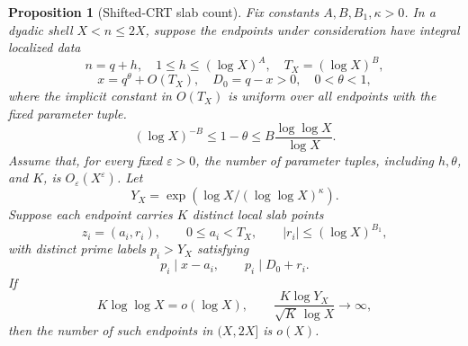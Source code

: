 \documentclass[11pt]{article}
\newtheorem{proposition}[theorem]{Proposition}
\theoremstyle{definition}
\newcommand{\eps}{\varepsilon}
\newcommand{\1}{\mathbf 1}
\begin{document}
\begin{proposition}[Shifted-CRT slab count]\label{prop:slab}
Fix constants \(A,B,B_1,\kappa>0\).  In a dyadic shell \(X<n\le2X\), suppose the
endpoints under consideration have integral localized data
\[
  n=q+h,\quad 1\le h\le(\log X)^A,\quad T_X=(\log X)^B,
\]
\[
  x=q^\theta+O(T_X),\quad D_0=q-x>0,\quad 0<\theta<1,
\]
where the implicit constant in \(O(T_X)\) is uniform over all endpoints with
the fixed parameter tuple.
\[
  (\log X)^{-B}\le 1-\theta\le B\frac{\log\log X}{\log X}.
\]
Assume that, for every fixed \(\eps>0\), the number of parameter tuples,
including \(h,\theta\), and \(K\), is \(O_\eps(X^\eps)\).  Let
\[
  Y_X=\exp(\log X/(\log\log X)^{\kappa}).
\]
Suppose each endpoint carries \(K\) distinct local slab points
\[
  z_i=(a_i,r_i),\qquad
  0\le a_i<T_X,\qquad |r_i|\le(\log X)^{B_1},
\]
with distinct prime labels \(p_i>Y_X\) satisfying
\[
  p_i\mid x-a_i,\qquad p_i\mid D_0+r_i.
\]
If
\[
  K\log\log X=o(\log X),\qquad
  \frac{K\log Y_X}{\sqrt K\,\log X}\to\infty,
\]
then the number of such endpoints in \((X,2X]\) is \(o(X)\).
\end{proposition}
\end{document}
